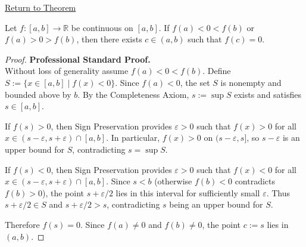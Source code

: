 \newpage
{}
\label{prf:location-of-roots}

\begin{remark*}[Return]
\hyperref[thm:location-of-roots]{Return to Theorem}
\end{remark*}

\begin{theorem*}
Let $f : [a,b] \to \mathbb{R}$ be continuous on $[a,b]$. If $f(a) < 0 < f(b)$ or $f(a) > 0 > f(b)$, then there exists $c \in (a,b)$ such that $f(c) = 0$.
\end{theorem*}

\begin{proof}
\textbf{Professional Standard Proof.}~\\
Without loss of generality assume $f(a) < 0 < f(b)$. Define $S := \{ x \in [a,b] \mid f(x) < 0 \}$. Since $f(a) < 0$, the set $S$ is nonempty and bounded above by $b$. By the Completeness Axiom, $s := \sup S$ exists and satisfies $s \in [a,b]$.

If $f(s) > 0$, then Sign Preservation provides $\varepsilon > 0$ such that $f(x) > 0$ for all $x \in (s - \varepsilon, s + \varepsilon) \cap [a,b]$. In particular, $f(x) > 0$ on $(s - \varepsilon, s]$, so $s - \varepsilon$ is an upper bound for $S$, contradicting $s = \sup S$.

If $f(s) < 0$, then Sign Preservation provides $\varepsilon > 0$ such that $f(x) < 0$ for all $x \in (s - \varepsilon, s + \varepsilon) \cap [a,b]$. Since $s < b$ (otherwise $f(b) < 0$ contradicts $f(b) > 0$), the point $s + \varepsilon/2$ lies in this interval for sufficiently small $\varepsilon$. Thus $s + \varepsilon/2 \in S$ and $s + \varepsilon/2 > s$, contradicting $s$ being an upper bound for $S$.

Therefore $f(s) = 0$. Since $f(a) \neq 0$ and $f(b) \neq 0$, the point $c := s$ lies in $(a,b)$.
\end{proof}

